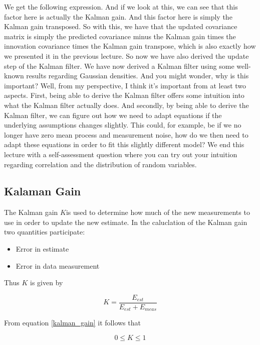 We get the following expression.
And if we look at this, we can see that this factor here
is actually the Kalman gain.
And this factor here is simply the Kalman gain transposed.
So with this, we have that the updated covariance matrix
is simply the predicted covariance
minus the Kalman gain times the innovation
covariance times the Kalman gain transpose, which
is also exactly how we presented it in the previous lecture.
So now we have also derived the update step
of the Kalman filter.
We have now derived a Kalman filter
using some well-known results regarding Gaussian densities.
And you might wonder, why is this important?
Well, from my perspective, I think
it's important from at least two aspects.
First, being able to derive the Kalman filter
offers some intuition into what the Kalman filter actually
does.
And secondly, by being able to derive the Kalman filter,
we can figure out how we need to adapt equations
if the underlying assumptions changes slightly.
This could, for example, be if we no longer
have zero mean process and measurement noise,
how do we then need to adapt these equations in order to fit
this slightly different model?
We end this lecture with a self-assessment question
where you can try out your intuition regarding correlation
and the distribution of random variables.



\subsection{Kalaman Gain}
The Kalman gain $K$is used to determine how much of the new measurements to use in order to update the new estimate.
In the caluclation of the Kalman gain two quantities participate:

\begin{itemize}
\item Error in estimate
\item Error in data measurement
\end{itemize}

Thus $K$ is given by

\begin{equation}
K = \frac{E_{est}}{E_{est} + E_{meas}}
\label{kalman_gain}
\end{equation} 

From equation \ref{kalman_gain} it follows that

\begin{equation}
0 \leq K \leq 1
\label{kalman_gain_condition}
\end{equation} 

